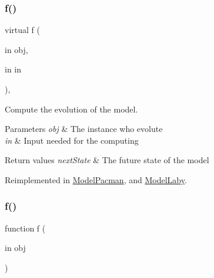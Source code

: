 \subsubsection{\texorpdfstring{f()}{f()}\hspace{0.1cm}{\footnotesize\ttfamily [1/2]}}
{\footnotesize\ttfamily virtual f (\begin{DoxyParamCaption}\item[{in}]{obj,  }\item[{in}]{in }\end{DoxyParamCaption})\hspace{0.3cm}{\ttfamily [virtual]}, {\ttfamily [inherited]}}



Compute the evolution of the model. 


\begin{DoxyParams}{Parameters}
{\em obj} & The instance who evolute \\
\hline
{\em in} & Input needed for the computing \\
\hline
\end{DoxyParams}

\begin{DoxyRetVals}{Return values}
{\em next\+State} & The future state of the model \\
\hline
\end{DoxyRetVals}


Reimplemented in \hyperlink{class_model_pacman_a6f3b146c92a207e95690d08975e1e072}{Model\+Pacman}, and \hyperlink{class_model_laby_a6f3b146c92a207e95690d08975e1e072}{Model\+Laby}.

\mbox{\label{class_model_walls_af07620c51528eb1e504befcf52ca0cee}} 
\subsubsection{\texorpdfstring{f()}{f()}\hspace{0.1cm}{\footnotesize\ttfamily [2/2]}}
{\footnotesize\ttfamily function f (\begin{DoxyParamCaption}\item[{in}]{obj }\end{DoxyParamCaption})}

\mbox{\label{class_model_walls_a07dadfabe92bf9a144b8a862720e7746}} 
